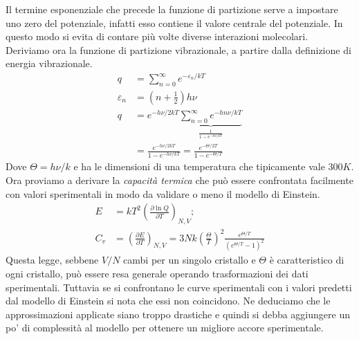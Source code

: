 \documentclass[oneside]{amsbook}
\numberwithin{section}{chapter}
\numberwithin{equation}{section}
\numberwithin{figure}{section}
\begin{document}
Il termine esponenziale che precede la funzione di partizione serve a impostare uno zero del potenziale, infatti esso contiene il valore centrale del potenziale. In questo modo si evita di contare più volte diverse interazioni molecolari. 
Deriviamo ora la funzione di partizione vibrazionale, a partire dalla definizione di energia vibrazionale.
\begin{equation}
\begin{aligned}
q&=\sum_{n=0}^\infty e^{-\varepsilon_n/kT}\\
\varepsilon_n&=\left(n+\frac{1}{2}\right)h\nu\\
q&=e^{-h\nu/2kT}\underbrace{\sum_{n=0}^\infty e^{-hn\nu/kT}}_{\frac{1}{1-e^{-h\nu/kT}}}\\
&=\frac{e^{-h\nu/2kT}}{1-e^{-h\nu/kT}}=\frac{e^{-\Theta/2T}}{1-e^{-\Theta/T}}
\end{aligned}
\end{equation}
Dove $\Theta=h\nu/k$ e ha le dimensioni di una temperatura che tipicamente vale $300K$.
Ora proviamo a derivare la \emph{capacità termica} che può essere confrontata facilmente con valori sperimentali in modo da validare o meno il modello di Einstein.
\begin{equation}
\begin{aligned}
E&=kT^2\left(\frac{\partial \ln Q}{\partial T}\right)_{N,V};\\
C_v&=\left(\frac{\partial E}{\partial T}\right)_{N,V}=3Nk\left(\frac{\Theta}{T}\right)^2\frac{e^{\Theta/T}}{(e^{\Theta/T}-1)^2}
\end{aligned}
\end{equation}
Questa legge, sebbene $V/N$ cambi per un singolo cristallo e $\Theta$ è caratteristico di ogni cristallo, può essere resa generale operando trasformazioni dei dati sperimentali. Tuttavia se si confrontano le curve sperimentali con i valori predetti dal modello di Einstein si nota che essi non coincidono. Ne deduciamo che le approssimazioni applicate siano troppo drastiche e quindi si debba aggiungere un po' di complessità al modello per ottenere un migliore accore sperimentale.
\end{document}
